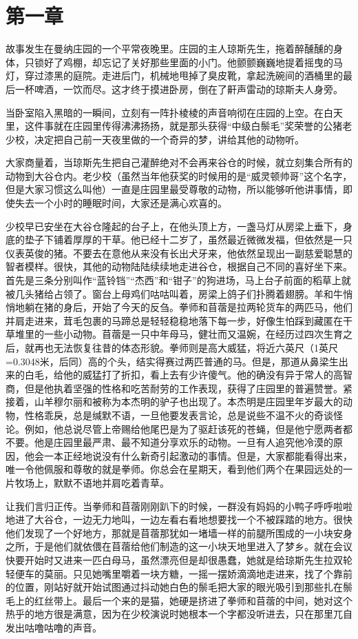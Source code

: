 \chapter{第一章}

故事发生在曼纳庄园的一个平常夜晚里。庄园的主人琼斯先生，拖着醉醺醺的身体，只锁好了鸡棚，却忘记了关好那些里面的小门。他颤颤巍巍地提着摇曳的马灯，穿过漆黑的庭院。走进后门，机械地甩掉了臭皮靴，拿起洗碗间的酒桶里的最后一杯啤酒，一饮而尽。这才终于摸进卧房，倒在了鼾声雷动的琼斯夫人身旁。

当卧室陷入黑暗的一瞬间，立刻有一阵扑棱棱的声音响彻在庄园的上空。在白天里，这件事就在庄园里传得沸沸扬扬，就是那头获得“中级白鬃毛”奖荣誉的公猪老少校，决定把自己前一天夜里做的一个奇异的梦，讲给其他的动物听。

大家商量着，当琼斯先生把自己灌醉绝对不会再来谷仓的时候，就立刻集合所有的动物到大谷仓内。老少校（虽然当年他获奖的时候用的是“威灵顿帅哥”这个名字，但是大家习惯这么叫他）一直是庄园里最受尊敬的动物，所以能够听他讲事情，即使失去一个小时的睡眠时间，大家还是满心欢喜的。

少校早已安坐在大谷仓隆起的台子上，在他头顶上方，一盏马灯从房梁上垂下，身底的垫子下铺着厚厚的干草。他已经十二岁了，虽然最近微微发福，但依然是一只仪表英俊的猪。不要去在意他从来没有长出犬牙来，他依然呈现出一副慈爱聪慧的智者模样。很快，其他的动物陆陆续续地走进谷仓，根据自己不同的喜好坐下来。首先是三条分别叫作“蓝铃铛”“杰西”和“钳子”的狗进场，马上台子前面的稻草上就被几头猪给占领了。窗台上母鸡们咕咕叫着，房梁上鸽子们扑腾着翅膀。羊和牛悄悄地躺在猪的身后，开始了今天的反刍。拳师和苜蓿是拉两轮货车的两匹马，他们并肩走进来，茸毛包裹的马蹄总是轻轻稳稳地落下每一步，好像生怕踩到藏匿在干草堆里的一些小动物。苜蓿是一只中年母马，健壮而又温婉，在经历过四次生育之后，就再也无法恢复往昔的体态形貌。拳师则是高大威猛，将近六英尺（1英尺=0.3048米，后同）高的个头，结实得赛过两匹普通的马。但是，那道从鼻梁生出来的白毛，给他的威猛打了折扣，看上去有少许傻气。他的确没有异于常人的高智商，但是他执着坚强的性格和吃苦耐劳的工作表现，获得了庄园里的普遍赞誉。紧接着，山羊穆尔丽和被称为本杰明的驴子也出现了。本杰明是庄园里年岁最大的动物，性格乖戾，总是缄默不语，一旦他要发表言论，总是说些不温不火的奇谈怪论。例如，他总说尽管上帝赐给他尾巴是为了驱赶该死的苍蝇，但是他宁愿两者都不要。他是庄园里最严肃、最不知道分享欢乐的动物。一旦有人追究他冷漠的原因，他会一本正经地说没有什么新奇引起激动的事情。但是，大家都能看得出来，唯一令他佩服和尊敬的就是拳师。你总会在星期天，看到他们两个在果园远处的一片牧场上，默默不语地并肩吃着青草。

让我们言归正传。当拳师和苜蓿刚刚趴下的时候，一群没有妈妈的小鸭子呼呼啦啦地进了大谷仓，一边无力地叫，一边左看右看地想要找一个不被踩踏的地方。很快他们发现了一个好地方，那就是苜蓿那犹如一堵墙一样的前腿所围成的一小块安身之所，于是他们就依偎在苜蓿给他们制造的这一小块天地里进入了梦乡。就在会议快要开始时又进来一匹白母马，虽然漂亮但是却很愚蠢，她就是给琼斯先生拉双轮轻便车的莫丽。只见她嘴里嚼着一块方糖，一摇一摆娇滴滴地走进来，找了个靠前的位置，刚站好就开始试图通过抖动她白色的鬃毛把大家的眼光吸引到那些扎在鬃毛上的红丝带上。最后一个来的是猫，她硬是挤进了拳师和苜蓿的中间，她对这个热乎的地方很是满意，因为在少校演说时她根本一个字都没听进去，只在那里兀自发出咕噜咕噜的声音。

